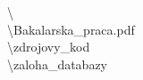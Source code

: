 \textbackslash \\
\textbackslash Bakalarska\_praca.pdf\\
\textbackslash zdrojovy\_kod\\
\textbackslash zaloha\_databazy\\

